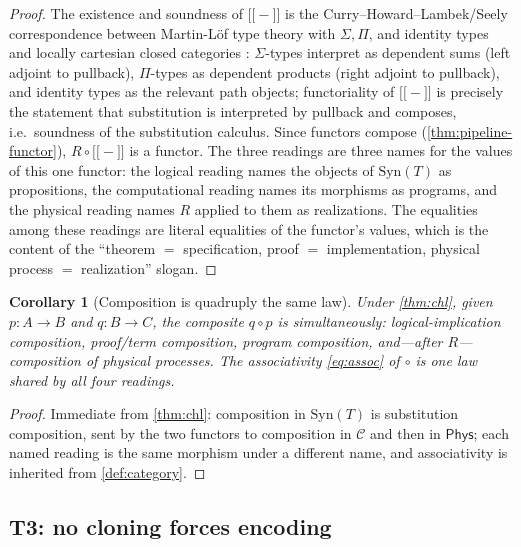 \documentclass[12pt]{article}
\newtheorem{corollary}[theorem]{Corollary}
\theoremstyle{definition}
\theoremstyle{remark}
\newcommand{\Phys}{\mathsf{Phys}}
\newcommand{\llbracket}{\mathopen{[\![}}
\newcommand{\rrbracket}{\mathclose{]\!]}}
\begin{document}
\begin{proof}
The existence and soundness of $\llbracket-\rrbracket$ is the
Curry--Howard--Lambek/Seely correspondence between Martin-L\"of type theory with
$\Sigma,\Pi$, and identity types and locally cartesian closed categories
\cite{LambekScott1986,MacLane1998,HoTT2013}: $\Sigma$-types interpret as
dependent sums (left adjoint to pullback), $\Pi$-types as dependent products
(right adjoint to pullback), and identity types as the relevant path objects;
functoriality of $\llbracket-\rrbracket$ is precisely the statement that
substitution is interpreted by pullback and composes, i.e.\ soundness of the
substitution calculus. Since functors compose (\cref{thm:pipeline-functor}),
$R\circ\llbracket-\rrbracket$ is a functor. The three readings are three names
for the values of this one functor: the logical reading names the objects of
$\mathrm{Syn}(T)$ as propositions, the computational reading names its morphisms
as programs, and the physical reading names $R$ applied to them as realizations.
The equalities among these readings are literal equalities of the functor's
values, which is the content of the ``theorem $=$ specification, proof $=$
implementation, physical process $=$ realization'' slogan.
\end{proof}

\begin{corollary}[Composition is quadruply the same law]
\label{cor:composition}
Under \cref{thm:chl}, given $p:A\to B$ and $q:B\to C$, the composite $q\circ p$ is
simultaneously: logical-implication composition, proof/term composition,
program composition, and---after $R$---composition of physical processes. The
associativity \eqref{eq:assoc} of $\circ$ is one law shared by all four readings.
\end{corollary}

\begin{proof}
Immediate from \cref{thm:chl}: composition in $\mathrm{Syn}(T)$ is substitution
composition, sent by the two functors to composition in $\mathcal{C}$ and then in
$\Phys$; each named reading is the same morphism under a different name, and
associativity is inherited from \cref{def:category}.
\end{proof}

\subsection{T3: no cloning forces encoding}
\end{document}
